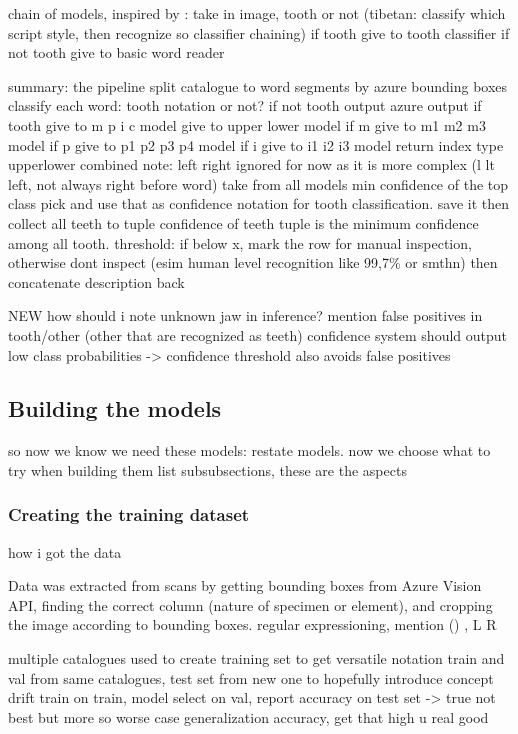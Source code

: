 \documentclass{article}
\begin{document}
chain of models, inspired by \cite{tibetan_ocr}: take in image, tooth or not
    (tibetan: classify which script style, then recognize so classifier chaining)
    if tooth give to tooth classifier 
    if not tooth give to basic word reader

summary: the pipeline
split catalogue to word segments by azure bounding boxes 
classify each word: tooth notation or not?
if not tooth output azure output
if tooth   
    give to m p i c model
    give to upper lower model 
    if m
        give to m1 m2 m3 model
    if p
        give to p1 p2 p3 p4 model
    if i
        give to i1 i2 i3 model
    return index type upperlower combined
    note: left right ignored for now as it is more complex (l lt left, not always right before word)
    take from all models min confidence of the top class pick and use that as confidence notation for 
    tooth classification. save it
then collect all teeth to tuple 
    confidence of teeth tuple is the minimum confidence among all tooth.
    threshold: if below x, mark the row for manual inspection, otherwise dont inspect (esim human level recognition like 99,7\% or smthn)
then concatenate description back       

NEW
how should i note unknown jaw in inference?
mention false positives in tooth/other (other that are recognized as teeth)
    confidence system should output low class probabilities -> confidence 
    threshold also avoids false positives

\subsection{Building the models}

so now we know we need these models: restate models. now we choose what to try when building them
list subsubsections, these are the aspects

\subsubsection{Creating the training dataset}

how i got the data

Data was extracted from scans by getting bounding boxes from Azure Vision API,
finding the correct column (nature of specimen or element), and cropping the image 
according to bounding boxes.
regular expressioning, mention () , L R

multiple catalogues used to create training set to get versatile notation
train and val from same catalogues, test set from new one to hopefully introduce concept drift
    train on train, model select on val, report accuracy on test set -> true not best but more so worse case generalization accuracy, get that high u real good
\end{document}
